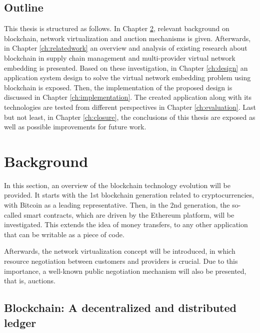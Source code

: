 \section{Outline}

This thesis is structured as follows. In Chapter \ref{ch:background}, relevant background on blockchain, network virtualization and auction mechanisms is given. Afterwards, in Chapter \ref{ch:relatedwork} an overview and analysis of existing research about blockchain in supply chain management and multi-provider virtual network embedding is presented. Based on these investigation, in Chapter \ref{ch:design} an application system design to solve the virtual network embedding problem using blockchain is exposed. Then, the implementation of the proposed design is discussed in Chapter \ref{ch:implementation}. The created application along with its technologies are tested from different perspectives in Chapter \ref{ch:evaluation}. Last but not least, in Chapter \ref{ch:closure}, the conclusions of this thesis are exposed as well as possible improvements for future work.


\chapter{Background}
\label{ch:background}

In this section, an overview of the blockchain technology evolution will be provided. It starts with the 1st blockchain generation related to cryptocurrencies, with Bitcoin as a leading representative. Then, in the 2nd generation, the so-called smart contracts, which are driven by the Ethereum platform, will be investigated. This extends the idea of money transfers, to any other application that can be writable as a piece of code.

Afterwards, the network virtualization concept will be introduced, in which resource negotiation between customers and providers is crucial. Due to this importance, a well-known public negotiation mechanism will also be presented, that is, auctions.

\section{Blockchain: A decentralized and distributed ledger}

